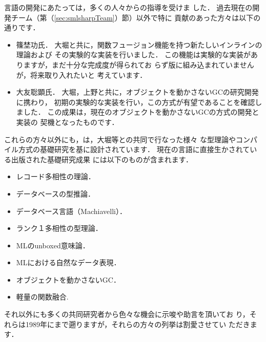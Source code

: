 \ifjp%
	\smlsharp{}言語の開発にあたっては，多くの人々からの指導を受けま
した．
	過去現在の開発チーム（第（\ref{sec:smlsharpTeam}）節）以外で特に
貢献のあった方々は以下の通りです．
\begin{itemize}
\item 篠埜功氏．
大堀と共に，関数フュージョン機能を持つ新たしいインラインの理論および
その実験的な実装を行いました．
	この機能は実験的な実装がありますが，まだ十分な完成度が得られてお
らず\smlsharp{}\version{}版に組み込まれていませんが，将来取り入れたいと
考えています．
\item 大友聡顕氏．
	大堀，上野と共に，オブジェクトを動かさないGCの研究開発に携わり，
初期の実験的な実装を行い，この方式が有望であることを確認しました．
	この成果は，現在のオブジェクトを動かさないGCの方式の開発と実装の
契機となったものです．
\end{itemize}
	これらの方々以外にも，\smlsharp{}は，大堀等との共同で行なった様々
な型理論やコンパイル方式の基礎研究を基に設計されています．
	現在の\smlsharp{}言語に直接生かされている出版された基礎研究成果
には以下のものが含まれます．
\begin{itemize}
\item レコード多相性の理論\cite{ohor92popl,ohor95toplas}．
\item データベースの型推論\cite{ohor88lfp}．
\item データベース言語（Machiavelli）\cite{ohor89sigmod,bune96tods}．
\item ランク１多相性の型理論\cite{ohor99icfp}．
\item MLのunboxed意味論\cite{ohor97unbox}．
\item MLにおける自然なデータ表現\cite{nguyen06ppdp}．
\item オブジェクトを動かさないGC\cite{ueno11icfp}．
\item 軽量の関数融合\cite{ohor07popl}.
\end{itemize}
	それ以外にも多くの共同研究者から色々な機会に示唆や助言を頂いてお
り，それらは1989年にまで遡りますが，それらの方々の列挙は割愛させてい
ただきます．
\else%

